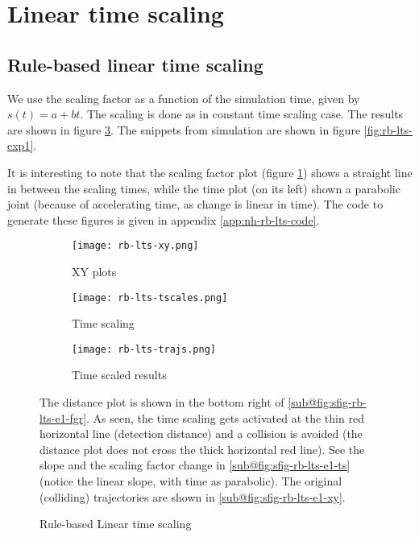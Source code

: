 
\section{Linear time scaling}

\subsection{Rule-based linear time scaling}

We use the scaling factor as a function of the simulation time, given by $s(t) = a + bt$. The scaling is done as in constant time scaling case. The results are shown in figure \ref{fig:rb-lts-exp1-graphs}. The snippets from simulation are shown in figure \ref{fig:rb-lts-exp1}.

It is interesting to note that the scaling factor plot (figure \ref{fig:sfig-rb-lts-e1-ts}) shows a straight line in between the scaling times, while the time plot (on its left) shown a parabolic joint (because of accelerating time, as change is linear in time). The code to generate these figures is given in appendix \ref{app:nh-rb-lts-code}.

\begin{figure}[ht]
    \centering
    \begin{subfigure}[b]{0.49\textwidth}
        \texttt{[image: rb-lts-xy.png]}
        \caption{XY plots}
        \label{fig:sfig-rb-lts-e1-xy}
        \texttt{[image: rb-lts-tscales.png]}
        \caption{Time scaling}
        \label{fig:sfig-rb-lts-e1-ts}
    \end{subfigure}
    \begin{subfigure}[b]{0.49\textwidth}
        \texttt{[image: rb-lts-trajs.png]}
        \caption{Time scaled results}
        \label{fig:sfig-rb-lts-e1-fgr}
    \end{subfigure}
    \caption{Rule-based Linear time scaling}
    \label{fig:rb-lts-exp1-graphs}
    \small
        The distance plot is shown in the bottom right of \ref{sub@fig:sfig-rb-lts-e1-fgr}. As seen, the time scaling gets activated at the thin red horizontal line (detection distance) and a collision is avoided (the distance plot does not cross the thick horizontal red line). See the slope and the scaling factor change in \ref{sub@fig:sfig-rb-lts-e1-ts} (notice the linear slope, with time as parabolic). The original (colliding) trajectories are shown in \ref{sub@fig:sfig-rb-lts-e1-xy}.
\end{figure}

